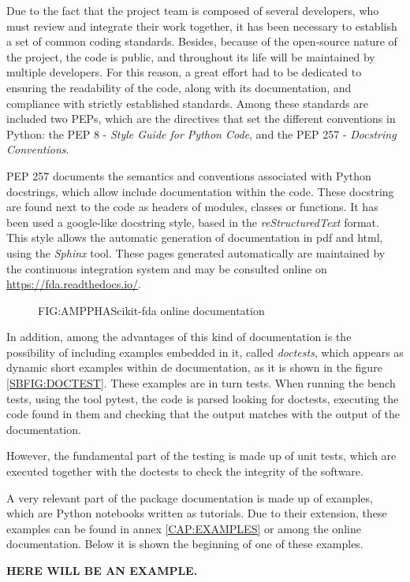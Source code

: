 

Due to the fact that the project team is composed of several developers, who
must review and integrate their work together, it has been necessary to
establish a set of common coding standards.
Besides, because of the open-source nature of the project, the code is
public, and throughout its life will be maintained by multiple developers. For
this reason, a great effort had to be dedicated to ensuring the readability of
the code, along with its documentation, and compliance with strictly established
standards. Among these standards are included two \ac{PEPs}, which are the directives that set the different conventions in Python:
the \acs{PEP} 8 - \textit{Style Guide for Python Code}, and the \acs{PEP} 257 - \textit{Docstring Conventions}.

\acs{PEP} 257 documents the semantics and conventions associated with Python
docstrings, which allow include documentation within the code. These docstring
are found next to the code as headers of modules, classes or functions. It has
been used a google-like docstring style, based in the \textit{reStructuredText} format.
This style allows the automatic generation of documentation in pdf and html,
using the \textit{Sphinx} tool. These pages generated automatically are maintained by
the continuous integration system and may be consulted online on
\href{https://fda.readthedocs.io/}{https://fda.readthedocs.io/}.

\begin{figure}[Scikit-fda online documentation]{FIG:AMPPHA}{Scikit-fda online documentation}
   \quad
\end{figure}

In addition, among the advantages of this kind of documentation is the
possibility of including examples embedded in it, called \textit{doctests}, which appears
 as dynamic short examples within de documentation, as it is shown in the
 figure \ref{SBFIG:DOCTEST}.
These examples are in turn tests. When running the bench tests, using the tool
pytest, the code is parsed looking for doctests, executing the code found in
them and checking that the output matches with the output of the documentation.

However, the fundamental part of the testing is made up of unit tests, which are
executed together with the doctests to check the integrity of the software.

A very relevant part of the package documentation is made up of examples,
which are Python notebooks written as tutorials. Due to their extension, these
examples can be found in annex \ref{CAP:EXAMPLES} or among the online documentation. Below it is
shown the beginning of one of these examples.

\textbf{HERE WILL BE AN EXAMPLE.}
